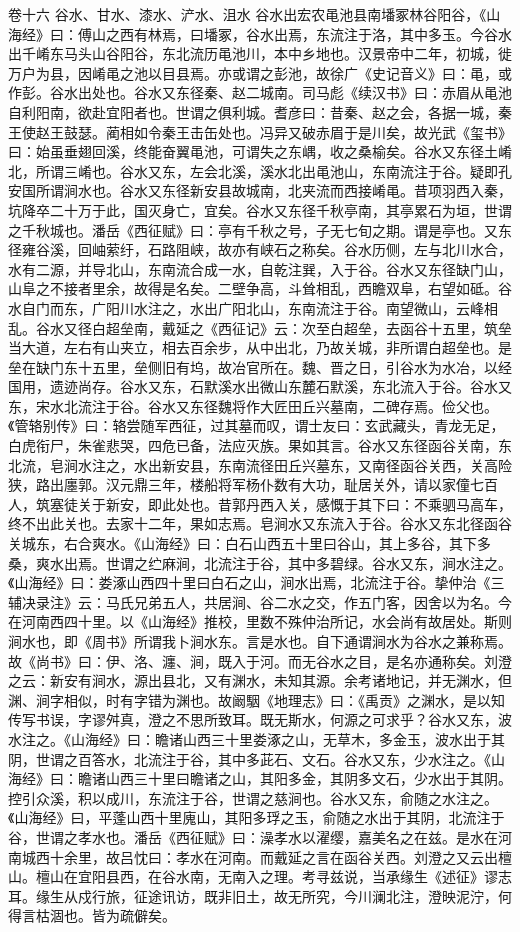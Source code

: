 \documentclass[12pt,UTF8]{ctexbook}
\begin{document}
卷十六  谷水、甘水、漆水、浐水、沮水 
谷水出宏农黾池县南墦冢林谷阳谷，《山海经》曰：傅山之西有林焉，曰墦冢，谷水出焉，东流注于洛，其中多玉。今谷水出千崤东马头山谷阳谷，东北流历黾池川，本中乡地也。汉景帝中二年，初城，徙万户为县，因崤黾之池以目县焉。亦或谓之彭池，故徐广《史记音义》曰：黾，或作彭。谷水出处也。谷水又东径秦、赵二城南。司马彪《续汉书》曰：赤眉从黾池自利阳南，欲赴宜阳者也。世谓之俱利城。耆彦曰：昔秦、赵之会，各据一城，秦王使赵王鼓瑟。蔺相如令秦王击缶处也。冯异又破赤眉于是川矣，故光武《玺书》曰：始虽垂翅回溪，终能奋翼黾池，可谓失之东嵎，收之桑榆矣。谷水又东径土崤北，所谓三崤也。谷水又东，左会北溪，溪水北出黾池山，东南流注于谷。疑即孔安国所谓涧水也。谷水又东径新安县故城南，北夹流而西接崤黾。昔项羽西入秦，坑降卒二十万于此，国灭身亡，宜矣。谷水又东径千秋亭南，其亭累石为垣，世谓之千秋城也。潘岳《西征赋》曰：亭有千秋之号，子无七旬之期。谓是亭也。又东径雍谷溪，回岫萦纡，石路阻峡，故亦有峡石之称矣。谷水历侧，左与北川水合，水有二源，并导北山，东南流合成一水，自乾注巽，入于谷。谷水又东径缺门山，山阜之不接者里余，故得是名矣。二壁争高，斗耸相乱，西瞻双阜，右望如砥。谷水自门而东，广阳川水注之，水出广阳北山，东南流注于谷。南望微山，云峰相乱。谷水又径白超垒南，戴延之《西征记》云：次至白超垒，去函谷十五里，筑垒当大道，左右有山夹立，相去百余步，从中出北，乃故关城，非所谓白超垒也。是垒在缺门东十五里，垒侧旧有坞，故冶官所在。魏、晋之日，引谷水为水冶，以经国用，遗迹尚存。谷水又东，石默溪水出微山东麓石默溪，东北流入于谷。谷水又东，宋水北流注于谷。谷水又东径魏将作大匠田丘兴墓南，二碑存焉。俭父也。《管辂别传》曰：辂尝随军西征，过其墓而叹，谓士友曰：玄武藏头，青龙无足，白虎衔尸，朱雀悲哭，四危已备，法应灭族。果如其言。谷水又东径函谷关南，东北流，皂涧水注之，水出新安县，东南流径田丘兴墓东，又南径函谷关西，关高险狭，路出廛郭。汉元鼎三年，楼船将军杨仆数有大功，耻居关外，请以家僮七百人，筑塞徒关于新安，即此处也。昔郭丹西入关，感慨于其下曰：不乘驷马高车，终不出此关也。去家十二年，果如志焉。皂涧水又东流入于谷。谷水又东北径函谷关城东，右合爽水。《山海经》曰：白石山西五十里曰谷山，其上多谷，其下多桑，爽水出焉。世谓之纻麻涧，北流注于谷，其中多碧绿。谷水又东，涧水注之。《山海经》曰：娄涿山西四十里曰白石之山，涧水出焉，北流注于谷。挚仲治《三辅决录注》云：马氏兄弟五人，共居涧、谷二水之交，作五门客，因舍以为名。今在河南西四十里。以《山海经》推校，里数不殊仲治所记，水会尚有故居处。斯则涧水也，即《周书》所谓我卜涧水东。言是水也。自下通谓涧水为谷水之兼称焉。故《尚书》曰：伊、洛、瀍、涧，既入于河。而无谷水之目，是名亦通称矣。刘澄之云：新安有涧水，源出县北，又有渊水，未知其源。余考诸地记，并无渊水，但渊、涧字相似，时有字错为渊也。故阚駰《地理志》曰：《禹贡》之渊水，是以知传写书误，字谬舛真，澄之不思所致耳。既无斯水，何源之可求乎？谷水又东，波水注之。《山海经》曰：瞻诸山西三十里娄涿之山，无草木，多金玉，波水出于其阴，世谓之百答水，北流注于谷，其中多茈石、文石。谷水又东，少水注之。《山海经》曰：瞻诸山西三十里曰瞻诸之山，其阳多金，其阴多文石，少水出于其阴。控引众溪，积以成川，东流注于谷，世谓之慈涧也。谷水又东，俞随之水注之。《山海经》曰，平蓬山西十里廆山，其阳多琈之玉，俞随之水出于其阴，北流注于谷，世谓之孝水也。潘岳《西征赋》曰：澡孝水以濯缨，嘉美名之在兹。是水在河南城西十余里，故吕忱曰：孝水在河南。而戴延之言在函谷关西。刘澄之又云出檀山。檀山在宜阳县西，在谷水南，无南入之理。考寻兹说，当承缘生《述征》谬志耳。缘生从戍行旅，征途讯访，既非旧土，故无所究，今川澜北注，澄映泥泞，何得言枯涸也。皆为疏僻矣。
\end{document}
